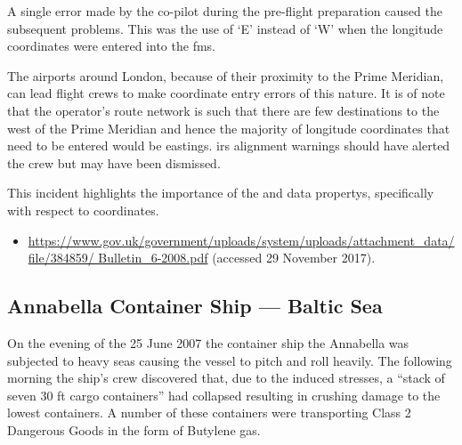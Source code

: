 A single error made by the co-pilot during the pre-flight preparation caused the subsequent problems. This was the use of `E' instead of `W' when the longitude coordinates were entered into the \gls{fms}.

The airports around London, because of their proximity to the Prime Meridian, can lead flight crews to make coordinate entry errors of this nature. It is of note that the operator's route network is such that there are few destinations to the west of the Prime Meridian and hence the majority of longitude coordinates that need to be entered would be eastings. \gls{irs} alignment warnings should have alerted the crew but may have been dismissed.

This incident highlights the importance of the  and  \glspl{data property}, specifically with respect to coordinates.

\begin{samepage}
\begin{itemize}
  \item \raggedright{\href{https://www.gov.uk/government/uploads/system/uploads/attachment_data/file/384859/Bulletin_6-2008.pdf}{https://www.gov.uk/government/uploads/system/uploads/attachment\_data/file/384859/ Bulletin\_6-2008.pdf} (accessed 29 November 2017).}
\end{itemize}
\end{samepage}

\subsection{Annabella Container Ship --- Baltic Sea} \label{bkm:incacc:annabella}
On the evening of the 25 June 2007 the container ship the Annabella was subjected to heavy seas causing the vessel to pitch and roll heavily. The following morning the ship’s crew discovered that, due to the induced stresses, a ``stack of seven 30 ft cargo containers'' had collapsed resulting in crushing damage to the lowest containers. A number of these containers were transporting Class 2 Dangerous Goods in the form of Butylene gas.
 
